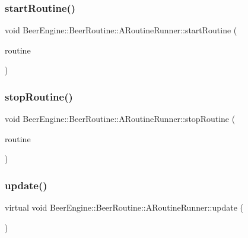 \subsubsection{\texorpdfstring{start\+Routine()}{startRoutine()}}
{\footnotesize\ttfamily void Beer\+Engine\+::\+Beer\+Routine\+::\+A\+Routine\+Runner\+::start\+Routine (\begin{DoxyParamCaption}\item[{\mbox{\hyperlink{class_beer_engine_1_1_beer_routine_1_1_beer_routine}{Beer\+Engine\+::\+Beer\+Routine\+::\+Beer\+Routine}} \&}]{routine }\end{DoxyParamCaption})}

\mbox{\label{class_beer_engine_1_1_beer_routine_1_1_a_routine_runner_a3c4bff92fb1bad462946a3b48e62a44e}} 
\subsubsection{\texorpdfstring{stop\+Routine()}{stopRoutine()}}
{\footnotesize\ttfamily void Beer\+Engine\+::\+Beer\+Routine\+::\+A\+Routine\+Runner\+::stop\+Routine (\begin{DoxyParamCaption}\item[{\mbox{\hyperlink{class_beer_engine_1_1_beer_routine_1_1_beer_routine}{Beer\+Engine\+::\+Beer\+Routine\+::\+Beer\+Routine}} $\ast$}]{routine }\end{DoxyParamCaption})}

\mbox{\label{class_beer_engine_1_1_beer_routine_1_1_a_routine_runner_a7a5253cb3a64dcb1aa66806fe7c12f62}} 
\subsubsection{\texorpdfstring{update()}{update()}}
{\footnotesize\ttfamily virtual void Beer\+Engine\+::\+Beer\+Routine\+::\+A\+Routine\+Runner\+::update (\begin{DoxyParamCaption}{ }\end{DoxyParamCaption})\hspace{0.3cm}{\ttfamily [virtual]}}



